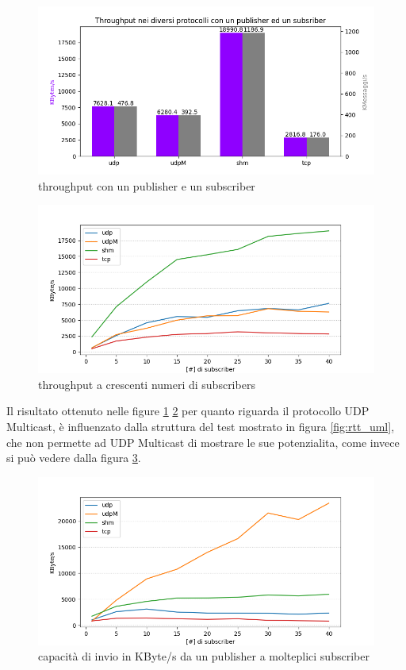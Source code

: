 \begin{figure}[H]
    \includegraphics[width=\textwidth]{./results/test3_throughput_combined.png} 
        \caption{throughput con un publisher e un subscriber}\label{fig:throughput_combined}
\end{figure}

\begin{figure}[H]
    \includegraphics[width=\textwidth]{./results/test3_graph_throughput.png} 
    \caption{throughput a crescenti numeri di subscribers}\label{fig:throughput_increasing}
\end{figure}

Il risultato ottenuto nelle figure \ref{fig:throughput_combined} \ref{fig:throughput_increasing} per quanto riguarda il protocollo UDP Multicast, è influenzato dalla struttura del test mostrato in figura \ref{fig:rtt_uml}, che non permette ad UDP Multicast di mostrare le sue potenzialita, come invece si può vedere dalla figura \ref{fig:bandwidth_graph}.

\begin{figure}[H]
    \includegraphics[width=\textwidth]{./results/test3_graph_bandwidth.png} 
        \caption{capacità di invio in KByte/s da un publisher a molteplici subscriber}\label{fig:bandwidth_graph}
\end{figure}


